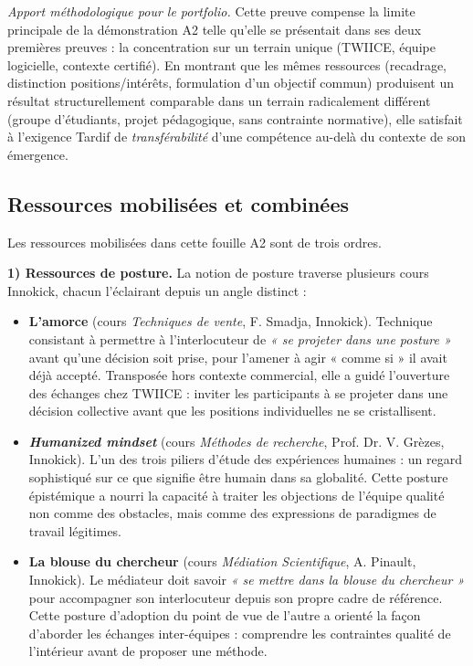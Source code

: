 \textit{Apport méthodologique pour le portfolio.} Cette preuve compense la limite principale de la démonstration A2 telle qu'elle se présentait dans ses deux premières preuves : la concentration sur un terrain unique (TWIICE, équipe logicielle, contexte certifié). En montrant que les mêmes ressources (recadrage, distinction positions/intérêts, formulation d'un objectif commun) produisent un résultat structurellement comparable dans un terrain radicalement différent (groupe d'étudiants, projet pédagogique, sans contrainte normative), elle satisfait à l'exigence Tardif de \emph{transférabilité} d'une compétence au-delà du contexte de son émergence.

\subsection{Ressources mobilisées et combinées}

Les ressources mobilisées dans cette fouille A2 sont de trois ordres.

\textbf{1) Ressources de posture.}
La notion de posture traverse plusieurs cours Innokick, chacun l'éclairant depuis un angle distinct :

\begin{itemize}
  \item \textbf{L'amorce} (cours \textit{Techniques de vente}, F. Smadja, Innokick). Technique consistant à permettre à l'interlocuteur de \emph{« se projeter dans une posture »} avant qu'une décision soit prise, pour l'amener à agir « comme si » il avait déjà accepté. Transposée hors contexte commercial, elle a guidé l'ouverture des échanges chez TWIICE : inviter les participants à se projeter dans une décision collective avant que les positions individuelles ne se cristallisent.
  \item \textbf{\emph{Humanized mindset}} (cours \textit{Méthodes de recherche}, Prof. Dr. V. Grèzes, Innokick). L'un des trois piliers d'étude des expériences humaines : un regard sophistiqué sur ce que signifie être humain dans sa globalité. Cette posture épistémique a nourri la capacité à traiter les objections de l'équipe qualité non comme des obstacles, mais comme des expressions de paradigmes de travail légitimes.
  \item \textbf{La blouse du chercheur} (cours \textit{Médiation Scientifique}, A. Pinault, Innokick). Le médiateur doit savoir \emph{« se mettre dans la blouse du chercheur »} pour accompagner son interlocuteur depuis son propre cadre de référence. Cette posture d'adoption du point de vue de l'autre a orienté la façon d'aborder les échanges inter-équipes : comprendre les contraintes qualité de l'intérieur avant de proposer une méthode.
\end{itemize}

